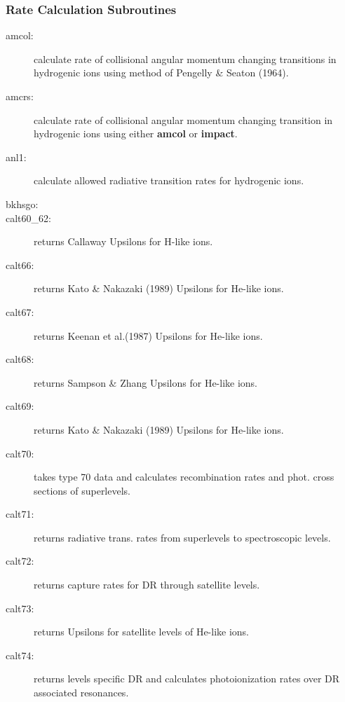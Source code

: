 \subsubsection {Rate Calculation Subroutines}

\begin{description}

\item[amcol:] calculate rate of collisional angular momentum changing
transitions in hydrogenic ions using method of Pengelly \& Seaton
(1964).

\item[amcrs:] calculate rate of collisional angular momentum changing 
transition in hydrogenic ions using either {\bf amcol} or {\bf impact}.

\item[anl1:] calculate allowed radiative transition rates for hydrogenic
ions.

\item[bkhsgo:]

\item[calt60\_62:] returns Callaway Upsilons for H-like
ions.

\item[calt66:] returns Kato \& Nakazaki (1989) Upsilons for He-like
ions.

\item[calt67:] returns Keenan et al.(1987) Upsilons for He-like ions.

\item[calt68:] returns Sampson \& Zhang Upsilons for He-like ions.

\item[calt69:] returns Kato \& Nakazaki (1989) Upsilons for He-like
ions.

\item[calt70:] takes type 70 data and calculates recombination rates and
phot. cross sections of superlevels. 

\item[calt71:] returns radiative trans. rates from superlevels to
spectroscopic levels.

\item[calt72:] returns capture rates for DR through satellite levels.

\item[calt73:] returns Upsilons for satellite levels of He-like ions.

\item[calt74:] returns levels specific DR and calculates photoionization
rates over DR associated resonances. 


\end{description}
